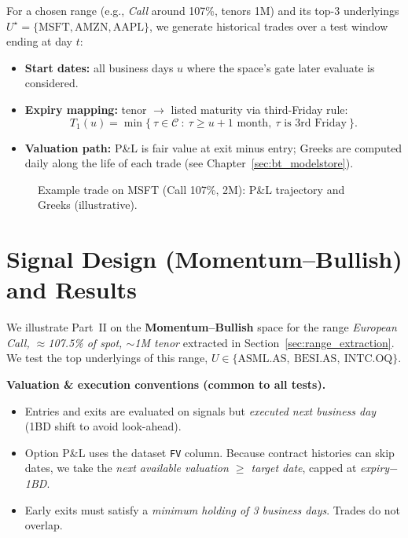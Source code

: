 \documentclass[12pt,a4paper]{report}
\begin{document}
For a chosen range (e.g., \emph{Call} around 107\%, tenors 1M) and its top-3 underlyings $U^\star=\{\text{MSFT},\text{AMZN},\text{AAPL}\}$, we generate historical trades over a test window ending at day $t$:
\begin{itemize}
  \item \textbf{Start dates:} all business days $u$ where the space’s gate later evaluate is considered.
  \item \textbf{Expiry mapping:} tenor $\to$ listed maturity via third-Friday rule:
  \[
  T_1(u)=\min\{\ \tau\in\mathcal{C}\ :\ \tau\ge u+ 1\text{ month},\ \tau\text{ is 3rd Friday}\ \}.
  \]
  \item \textbf{Valuation path:} P\&L is fair value at exit minus entry; Greeks are computed daily along the life of each trade (see Chapter~\ref{sec:bt_modelstore}).
\end{itemize}

\begin{figure}[h]
\centering
\fbox{\rule{0pt}{2.0in}\rule{.9\linewidth}{0pt}}
\caption{Example trade on MSFT (Call 107\%, 2M): P\&L trajectory and Greeks (illustrative).}
\label{fig:example_trade_ts}
\end{figure}

\section{Signal Design (Momentum–Bullish) and Results}
\label{sec:signal_mombull}

We illustrate Part~II on the \textbf{Momentum–Bullish} space for the range
\emph{European Call, $\approx$107.5\% of spot, $\sim$1M tenor} extracted in
Section~\ref{sec:range_extraction}. We test the top underlyings of this range,
\mbox{$U\in\{\text{ASML.AS},\ \text{BESI.AS},\ \text{INTC.OQ}\}$}.

\vspace{4pt}
\noindent\textbf{Valuation \& execution conventions (common to all tests).}
\begin{itemize}\itemsep2pt
  \item Entries and exits are evaluated on signals but \emph{executed next business day} (1BD shift to avoid look-ahead).
  \item Option P\&L uses the dataset \texttt{FV} column. Because contract histories can skip dates, we take the
        \emph{next available valuation $\ge$ target date}, capped at \emph{expiry$-$1BD}.
  \item Early exits must satisfy a \emph{minimum holding of 3 business days}. Trades do not overlap.
\end{itemize}
\end{document}
